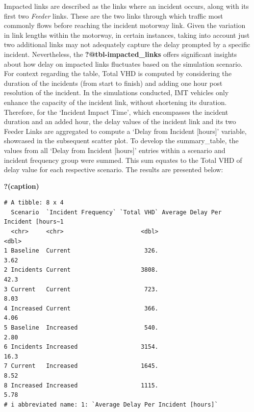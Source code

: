 \documentclass[
  letterpaper,
  authoryear]{elsarticle}
\begin{document}
Impacted links are described as the links where an incident occurs,
along with its first two \emph{Feeder} links. These are the two links
through which traffic most commonly flows before reaching the incident
motorway link. Given the variation in link lengths within the motorway,
in certain instances, taking into account just two additional links may
not adequately capture the delay prompted by a specific incident.
Nevertheless, the \textbf{?@tbl-impacted\_links} offers significant
insights about how delay on impacted links fluctuates based on the
simulation scenario. For context regarding the table, Total VHD is
computed by considering the duration of the incidents (from start to
finish) and adding one hour post resolution of the incident. In the
simulations conducted, IMT vehicles only enhance the capacity of the
incident link, without shortening its duration. Therefore, for the
`Incident Impact Time', which encompasses the incident duration and an
added hour, the delay values of the incident link and its two Feeder
Links are aggregated to compute a `Delay from Incident {[}hours{]}'
variable, showcased in the subsequent scatter plot. To develop the
summary\_table, the values from all `Delay from Incident {[}hours{]}'
entries within a scenario and incident frequency group were summed. This
sum equates to the Total VHD of delay value for each respective
scenario. The results are presented below:

\begin{table}

\caption{\textbf{?(caption)}}\begin{minipage}[t]{\linewidth}

{\centering 

\begin{verbatim}
# A tibble: 8 x 4
  Scenario  `Incident Frequency` `Total VHD` Average Delay Per Incident [hours~1
  <chr>     <chr>                      <dbl>                               <dbl>
1 Baseline  Current                     326.                                3.62
2 Incidents Current                    3808.                               42.3 
3 Current   Current                     723.                                8.03
4 Increased Current                     366.                                4.06
5 Baseline  Increased                   540.                                2.80
6 Incidents Increased                  3154.                               16.3 
7 Current   Increased                  1645.                                8.52
8 Increased Increased                  1115.                                5.78
# i abbreviated name: 1: `Average Delay Per Incident [hours]`
\end{verbatim}

}

\end{minipage}%

\end{table}
\end{document}
